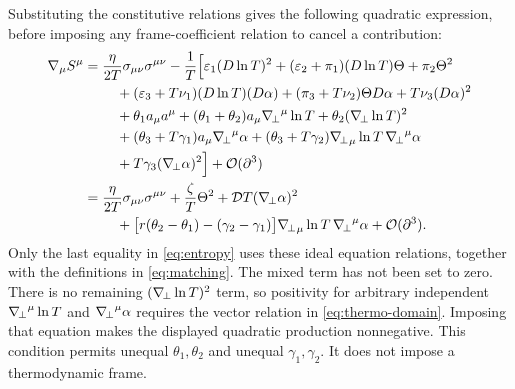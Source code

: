 Substituting the constitutive relations gives
the following quadratic expression, before imposing any frame-coefficient
relation to cancel a contribution:
\begin{equation}\label{eq:entropy}
 \begin{aligned}
 \nabla_\mu S^\mu
 ={}&\frac{\eta}{2T}\sigma_{\mu\nu}\sigma^{\mu\nu}
 -\frac1T\Bigl[\eps_1(D\ln T)^2+(\eps_2+\pi_1)(D\ln T)\Theta+\pi_2\Theta^2\\
 &\quad +(\eps_3+T\nu_1)(D\ln T)(D\alpha)
          +(\pi_3+T\nu_2)\Theta D\alpha+T\nu_3(D\alpha)^2\\
 &\quad +\theta_1a_\mu a^\mu
          +(\theta_1+\theta_2)a_\mu\perpgrad^\mu\ln T
          +\theta_2(\perpgrad\ln T)^2\\
 &\quad +(\theta_3+T\gamma_1)a_\mu\perpgrad^\mu\alpha
          +(\theta_3+T\gamma_2)\perpgrad_\mu\ln T\,\perpgrad^\mu\alpha\\
 &\quad +T\gamma_3(\perpgrad\alpha)^2\Bigr]
          +\OO(\partial^3)\\
 ={}&\frac{\eta}{2T}\sigma_{\mu\nu}\sigma^{\mu\nu}
       +\frac\zeta T\Theta^2+\cD T(\perpgrad\alpha)^2\\
 &\quad +\bigl[r(\theta_2-\theta_1)-(\gamma_2-\gamma_1)\bigr]
              \perpgrad_\mu\ln T\,\perpgrad^\mu\alpha+\OO(\partial^3).
 \end{aligned}
\end{equation}
Only the last equality in \eqref{eq:entropy} uses these
ideal equation relations, together with the definitions in
\eqref{eq:matching}. The mixed term
has not been set to zero. There is no remaining
$({\nabla_{\!\perp}}\ln T)^2$ term, so positivity for arbitrary independent
${\nabla_{\!\perp}}^\mu\ln T$ and ${\nabla_{\!\perp}}^\mu\alpha$ requires the vector
relation in \eqref{eq:thermo-domain}. Imposing that equation makes
the displayed quadratic production nonnegative. This condition permits unequal
$\theta_1,\theta_2$ and unequal $\gamma_1,\gamma_2$. It does not impose
a thermodynamic frame. 



